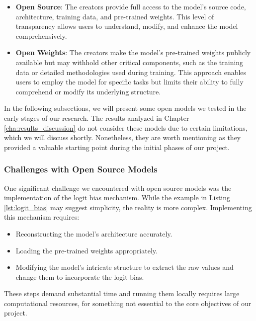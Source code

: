 \begin{itemize}
  \item \textbf{Open Source}: The creators provide full access to the model's source
    code, architecture, training data, and pre-trained weights. This level of transparency
    allows users to understand, modify, and enhance the model comprehensively.

  \item \textbf{Open Weights}: The creators make the model's pre-trained weights
    publicly available but may withhold other critical components, such as the
    training data or detailed methodologies used during training. This approach enables
    users to employ the model for specific tasks but limits their ability to fully
    comprehend or modify its underlying structure.
\end{itemize}

In the following subsections, we will present some open models we tested in the early
stages of our research. The results analyzed in Chapter
\ref{cha:results_discussion} do not consider these models due to certain
limitations, which we will discuss shortly. Nonetheless, they are worth mentioning
as they provided a valuable starting point during the initial phases of our project.

\subsubsection{Challenges with Open Source Models}

One significant challenge we encountered with open source models was the
implementation of the logit bias mechanism. While the example in Listing \ref{lst:logit_bias}
may suggest simplicity, the reality is more complex. Implementing this mechanism
requires:

\begin{itemize}
  \item Reconstructing the model's architecture accurately.

  \item Loading the pre-trained weights appropriately.

  \item Modifying the model's intricate structure to extract the raw values and change
    them to incorporate the logit bias.
\end{itemize}

These steps demand substantial time and running them locally requires large
computational resources, for something not essential to the core objectives of our
project.

